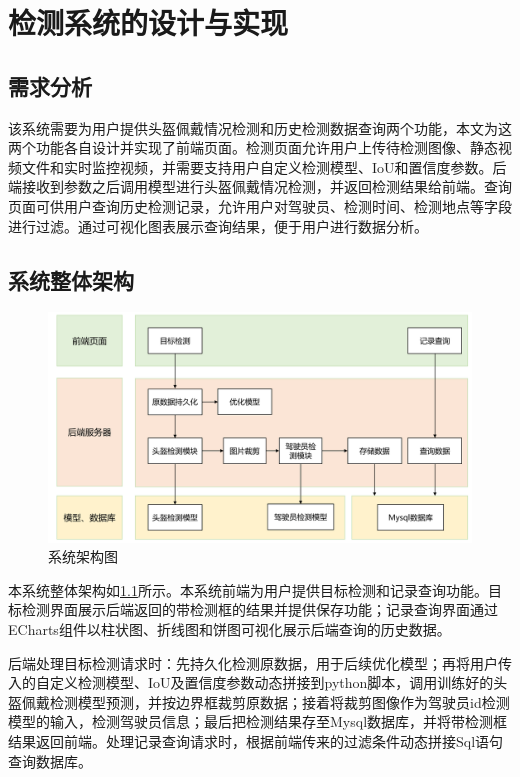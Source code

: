 \chapter{检测系统的设计与实现}

\section{需求分析}
该系统需要为用户提供头盔佩戴情况检测和历史检测数据查询两个功能，本文为这两个功能各自设计并实现了前端页面。检测页面允许用户上传待检测图像、静态视频文件和实时监控视频，并需要支持用户自定义检测模型、IoU和置信度参数。后端接收到参数之后调用模型进行头盔佩戴情况检测，并返回检测结果给前端。查询页面可供用户查询历史检测记录，允许用户对驾驶员、检测时间、检测地点等字段进行过滤。通过可视化图表展示查询结果，便于用户进行数据分析。

\section{系统整体架构}
\begin{figure}[!htb]
    \centering
    \includegraphics[width=1\textwidth]{figs/chap05/struct.png}
    \caption{系统架构图}
    \label{fig:struct}
\end{figure}
本系统整体架构如\ref{fig:struct}所示。本系统前端为用户提供目标检测和记录查询功能。目标检测界面展示后端返回的带检测框的结果并提供保存功能；记录查询界面通过ECharts组件以柱状图、折线图和饼图可视化展示后端查询的历史数据。

后端处理目标检测请求时：先持久化检测原数据，用于后续优化模型；再将用户传入的自定义检测模型、IoU及置信度参数动态拼接到python脚本，调用训练好的头盔佩戴检测模型预测，并按边界框裁剪原数据；接着将裁剪图像作为驾驶员id检测模型的输入，检测驾驶员信息；最后把检测结果存至Mysql数据库，并将带检测框结果返回前端。处理记录查询请求时，根据前端传来的过滤条件动态拼接Sql语句查询数据库。

